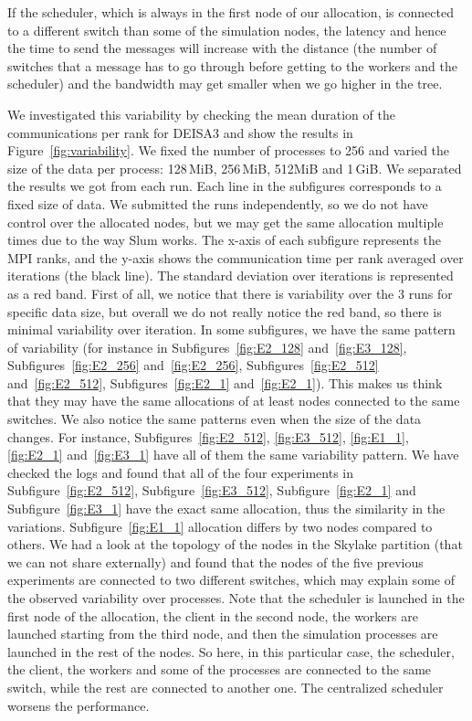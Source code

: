 If the scheduler, which is always in the first node of our allocation, is connected to a different switch than some of the simulation nodes, the latency and hence the time to send the messages will increase with the distance (the number of switches that a message has to go through before getting to the workers and the scheduler) and the bandwidth may get smaller when we go higher in the tree. 

We investigated this variability by checking the mean duration of the communications per rank for DEISA3 and show the results in Figure~\ref{fig:variability}.
We fixed the number of processes to 256 and varied the size of the data per process: 128\,MiB, 256\,MiB, 512MiB and 1\,GiB. We separated the results we got from each run. Each line in the subfigures corresponds to a fixed size of data. 
We submitted the runs independently, so we do not have control over the allocated nodes, but we may get the same allocation multiple times due to the way Slum works. 
The x-axis of each subfigure represents the MPI ranks, and the y-axis shows the communication time per rank averaged over iterations (the black line). The standard deviation over iterations is represented as a red band. 
First of all, we notice that there is variability over the 3 runs for specific data size, but overall we do not really notice the red band, so there is minimal variability over iteration. 
In some subfigures, we have the same pattern of variability (for instance in
Subfigures~\ref{fig:E2_128} and~\ref{fig:E3_128}, Subfigures~\ref{fig:E2_256} and~\ref{fig:E2_256}, Subfigures~\ref{fig:E2_512} and~\ref{fig:E2_512}, 
Subfigures~\ref{fig:E2_1} and~\ref{fig:E2_1}). 
This makes us think that they may have the same allocations of at least nodes connected to the same switches. 
We also notice the same patterns even when the size of the data changes. For instance, Subfigures~\ref{fig:E2_512}, \ref{fig:E3_512}, \ref{fig:E1_1}, \ref{fig:E2_1} and~\ref{fig:E3_1} have all of them the same variability pattern. 
We have checked the logs and found that all of the four experiments in  Subfigure~\ref{fig:E2_512}, Subfigure~\ref{fig:E3_512}, Subfigure~\ref{fig:E2_1} and Subfigure~\ref{fig:E3_1} have the exact same allocation, thus the similarity in the variations. Subfigure~\ref{fig:E1_1} allocation differs by two nodes compared to others.
We had a look at the topology of the nodes in the Skylake partition (that we can not share externally) and found that the nodes of the five previous experiments are connected to two different switches, which may explain some of the observed variability over processes. 
Note that the scheduler is launched in the first node of the allocation, the client in the second node, the workers are launched starting from the third node, and then the simulation processes are launched in the rest of the nodes. So here, in this particular case, the scheduler, the client, the workers and some of the processes are connected to the same switch, while the rest are connected to another one. 
The centralized scheduler worsens the performance.

